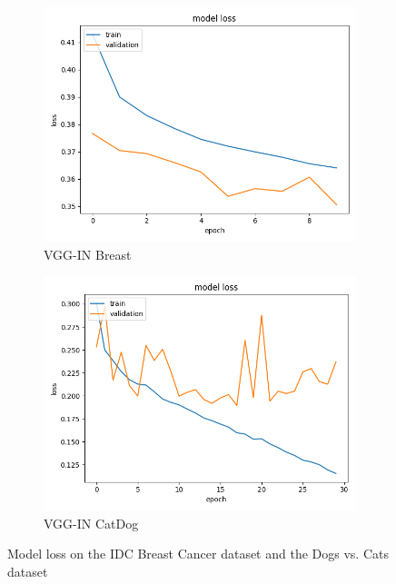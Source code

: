 \begin{figure}[h]
\begin{subfigure}[b]{.45\linewidth}
\includegraphics[width=\linewidth]{Figs/vgg_in_breast_loss.jpg}
\caption{VGG-IN Breast}
\end{subfigure}
\begin{subfigure}[b]{.45\linewidth}
\includegraphics[width=\linewidth]{Figs/vgg_in_catdog_loss.jpg}
\caption{VGG-IN CatDog}
\end{subfigure}

\caption{Model loss on the IDC Breast Cancer dataset and the Dogs vs. Cats dataset}
\label{fig:loss2}
\end{figure}

